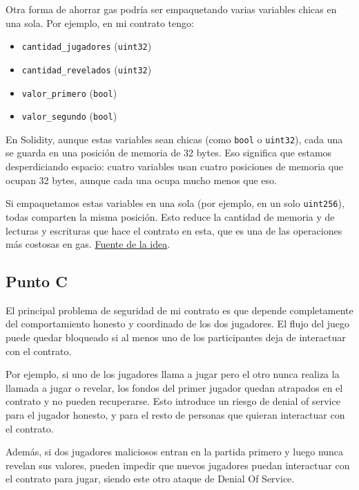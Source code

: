 \documentclass[12pt]{article}
\begin{document}
Otra forma de ahorrar gas podría ser empaquetando varias variables chicas en una sola.  
Por ejemplo, en mi contrato tengo:
\begin{itemize}
    \item \texttt{cantidad\_jugadores} (\texttt{uint32})
    \item \texttt{cantidad\_revelados} (\texttt{uint32})
    \item \texttt{valor\_primero} (\texttt{bool})
    \item \texttt{valor\_segundo} (\texttt{bool})
\end{itemize}

En Solidity, aunque estas variables sean chicas (como \texttt{bool} o \texttt{uint32}), 
cada una se guarda en una posición de memoria de 32 bytes.  
Eso significa que estamos desperdiciando espacio: cuatro variables usan cuatro posiciones de memoria que ocupan 32 bytes, 
aunque cada una ocupa mucho menos que eso.

Si empaquetamos estas variables en una sola (por ejemplo, en un solo \texttt{uint256}), 
todas comparten la misma posición.  
Esto reduce la cantidad de memoria y de lecturas y escrituras que hace el contrato en esta, 
que es una de las operaciones más costosas en gas. \href{https://rareskills.io/post/gas-optimization}{Fuente de la idea}.

\subsection*{Punto C}
El principal problema de seguridad de mi contrato es que depende completamente del comportamiento honesto y coordinado de los dos jugadores. El flujo del juego puede quedar bloqueado si al menos uno de los participantes deja de interactuar con el contrato.

Por ejemplo, si uno de los jugadores llama a jugar pero el otro nunca realiza la llamada a jugar o revelar, los fondos del primer jugador quedan atrapados en el contrato y no pueden recuperarse. Esto introduce un riesgo de denial of service para el jugador honesto, y para el resto de personas que quieran interactuar con el contrato. 

Además, si dos jugadores maliciosos entran en la partida primero y luego nunca revelan sus valores, pueden impedir que nuevos jugadores puedan interactuar con el contrato para jugar, siendo este otro ataque de Denial Of Service.
\end{document}
